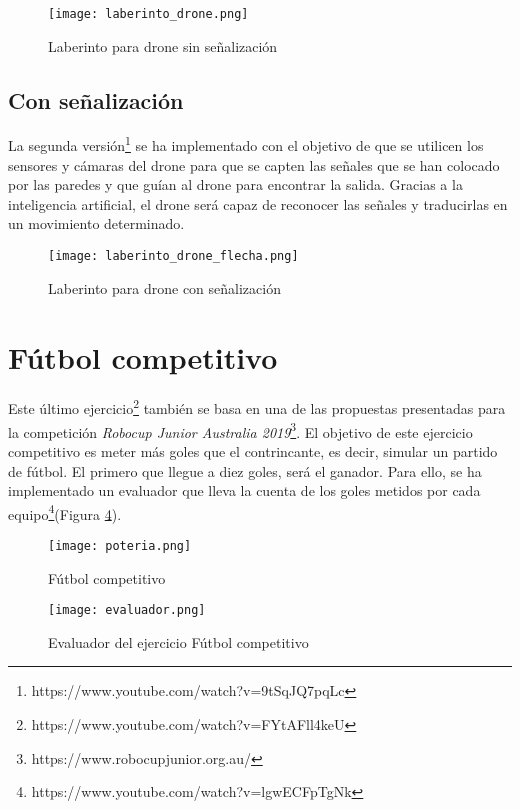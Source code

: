\begin{figure}[h!]
    \centering
    \texttt{[image: laberinto\_drone.png]}
    \caption{Laberinto para drone sin señalización}
    \label{fig:Laberinto_drone}
\end{figure}


\subsection{Con señalización}
La segunda versión\footnote{https://www.youtube.com/watch?v=9tSqJQ7pqLc} se ha implementado con el objetivo de que se utilicen los sensores y cámaras del drone para que se capten las señales que se han colocado por las paredes y que guían al drone para encontrar la salida. Gracias a la inteligencia artificial, el drone será capaz de reconocer las señales y traducirlas en un movimiento determinado.

\begin{figure}[h!]
    \centering
    \texttt{[image: laberinto\_drone\_flecha.png]}
    \caption{Laberinto para drone con señalización}
    \label{fig:Laberinto_drone_señal}
\end{figure}

\section{Fútbol competitivo}
Este último ejercicio\footnote{https://www.youtube.com/watch?v=FYtAFll4keU} también se basa en una de las propuestas presentadas para la competición \textit{Robocup Junior Australia 2019}\footnote{https://www.robocupjunior.org.au/}. El objetivo de este ejercicio competitivo es meter más goles que el contrincante, es decir, simular un partido de fútbol. El primero que llegue a diez goles, será el ganador. Para ello, se ha implementado un evaluador que lleva la cuenta de los goles metidos por cada equipo\footnote{https://www.youtube.com/watch?v=lgwECFpTgNk}(Figura \ref{fig:futbol_ev}). 

\begin{figure}[h!]
    \centering
    \texttt{[image: poteria.png]}
    \caption{Fútbol competitivo}
    \label{fig:futbol}
\end{figure}

\begin{figure}[h!]
    \centering
    \texttt{[image: evaluador.png]}
    \caption{Evaluador del ejercicio Fútbol competitivo}
    \label{fig:futbol_ev}
\end{figure}

